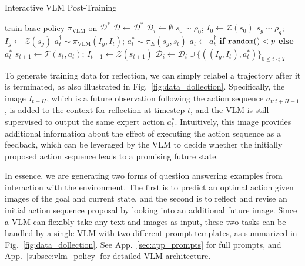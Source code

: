 \begin{algorithm}
\caption{Interactive VLM Post-Training}
\label{alg:training}
\begin{algorithmic}[1]
\STATE train base policy $\pi_\text{VLM}$ on $\mathcal{D}^*$
\STATE $\mathcal{D}\gets\mathcal{D}^*$
    \STATE $\mathcal{D}_i\gets\emptyset$
        \STATE $s_0\sim\rho_0$; $I_0\gets\mathcal{Z}(s_0)$
        \STATE $s_g\sim\rho_g$; $I_g\gets\mathcal{Z}(s_g)$
            \STATE $a_t^{\dag}\sim\pi_\text{VLM}(I_g, I_t)$; $a_t^* \sim \pi_E(s_g, s_t)$
            \STATE $a_t\gets a_t^{\dag}$ \textbf{if} ${\tt random()} <p$ \textbf{else} $a_t^*$
            \STATE $s_{t+1}\gets\mathcal{T}(s_t, a_t)$; $I_{t+1}\gets\mathcal{Z}(s_{t+1})$
        \ENDFOR
        \STATE $\mathcal{D}_i\!\gets\!\mathcal{D}_i\cup\{((I_g, I_t), a_t^*)\}_{0\le t<T}$
    \ENDFOR
\ENDFOR
\end{algorithmic}
\end{algorithm}

To generate training data for reflection, we can simply relabel a trajectory after it is terminated, as also illustrated in Fig.~\ref{fig:data_dollection}. Specifically, the image $I_{t+H}$, which is a future observation following the action sequence $a_{t:t+H-1}$, is added to the context for reflection at timestep $t$, and the VLM is still supervised to output the same expert action $a_t^*$. Intuitively, this image provides additional information about the effect of executing the action sequence as a feedback, which can be leveraged by the VLM to decide whether the initially proposed action sequence leads to a promising future state. 

In essence, we are generating two forms of question answering examples from interaction with the environment. The first is to predict an optimal action given images of the goal and current state, and the second is to reflect and revise an initial action sequence proposal by looking into an additional future image.
Since a VLM can flexibly take any text and images as input, these two tasks can be handled by a single VLM with two different prompt templates, as summarized in Fig.~\ref{fig:data_dollection}. See App.~\ref{sec:app_prompts} for full prompts, and App.~\ref{subsec:vlm_policy} for detailed VLM architecture.

